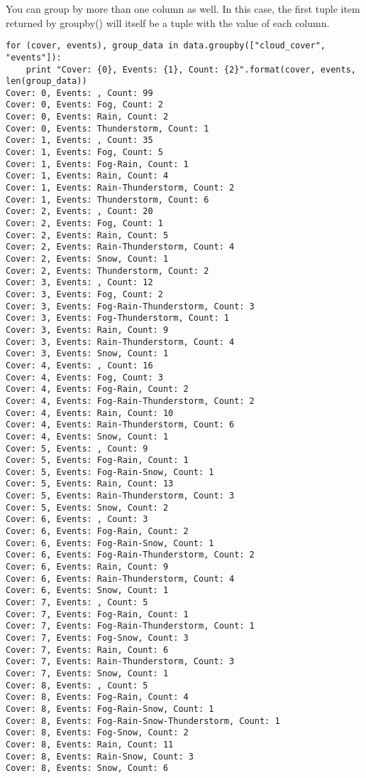 You can group by more than one column as well. In this case, the first tuple item returned by groupby() will itself be a tuple with the value of each column.
\begin{framed}
\begin{verbatim}
for (cover, events), group_data in data.groupby(["cloud_cover", "events"]):
    print "Cover: {0}, Events: {1}, Count: {2}".format(cover, events, len(group_data))
Cover: 0, Events: , Count: 99
Cover: 0, Events: Fog, Count: 2
Cover: 0, Events: Rain, Count: 2
Cover: 0, Events: Thunderstorm, Count: 1
Cover: 1, Events: , Count: 35
Cover: 1, Events: Fog, Count: 5
Cover: 1, Events: Fog-Rain, Count: 1
Cover: 1, Events: Rain, Count: 4
Cover: 1, Events: Rain-Thunderstorm, Count: 2
Cover: 1, Events: Thunderstorm, Count: 6
Cover: 2, Events: , Count: 20
Cover: 2, Events: Fog, Count: 1
Cover: 2, Events: Rain, Count: 5
Cover: 2, Events: Rain-Thunderstorm, Count: 4
Cover: 2, Events: Snow, Count: 1
Cover: 2, Events: Thunderstorm, Count: 2
Cover: 3, Events: , Count: 12
Cover: 3, Events: Fog, Count: 2
Cover: 3, Events: Fog-Rain-Thunderstorm, Count: 3
Cover: 3, Events: Fog-Thunderstorm, Count: 1
Cover: 3, Events: Rain, Count: 9
Cover: 3, Events: Rain-Thunderstorm, Count: 4
Cover: 3, Events: Snow, Count: 1
Cover: 4, Events: , Count: 16
Cover: 4, Events: Fog, Count: 3
Cover: 4, Events: Fog-Rain, Count: 2
Cover: 4, Events: Fog-Rain-Thunderstorm, Count: 2
Cover: 4, Events: Rain, Count: 10
Cover: 4, Events: Rain-Thunderstorm, Count: 6
Cover: 4, Events: Snow, Count: 1
Cover: 5, Events: , Count: 9
Cover: 5, Events: Fog-Rain, Count: 1
Cover: 5, Events: Fog-Rain-Snow, Count: 1
Cover: 5, Events: Rain, Count: 13
Cover: 5, Events: Rain-Thunderstorm, Count: 3
Cover: 5, Events: Snow, Count: 2
Cover: 6, Events: , Count: 3
Cover: 6, Events: Fog-Rain, Count: 2
Cover: 6, Events: Fog-Rain-Snow, Count: 1
Cover: 6, Events: Fog-Rain-Thunderstorm, Count: 2
Cover: 6, Events: Rain, Count: 9
Cover: 6, Events: Rain-Thunderstorm, Count: 4
Cover: 6, Events: Snow, Count: 1
Cover: 7, Events: , Count: 5
Cover: 7, Events: Fog-Rain, Count: 1
Cover: 7, Events: Fog-Rain-Thunderstorm, Count: 1
Cover: 7, Events: Fog-Snow, Count: 3
Cover: 7, Events: Rain, Count: 6
Cover: 7, Events: Rain-Thunderstorm, Count: 3
Cover: 7, Events: Snow, Count: 1
Cover: 8, Events: , Count: 5
Cover: 8, Events: Fog-Rain, Count: 4
Cover: 8, Events: Fog-Rain-Snow, Count: 1
Cover: 8, Events: Fog-Rain-Snow-Thunderstorm, Count: 1
Cover: 8, Events: Fog-Snow, Count: 2
Cover: 8, Events: Rain, Count: 11
Cover: 8, Events: Rain-Snow, Count: 3
Cover: 8, Events: Snow, Count: 6

\end{verbatim}
\end{framed}
